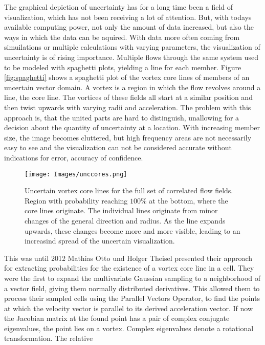 \noindent The graphical depiction of uncertainty has for a long time
been a field of visualization, which has not been receiving a lot of
attention. But, with todays available computing power, not only the
amount of data increased, but also the ways in which the data can be
aquired. With data more often coming from simuilations or multiple
calculations with varying parameters, the visualization of uncertainty
is of rising importance. Multiple flows through the same system used to
be modeled with spaghetti plots, yielding a line for each member. Figure
\ref{fig:spaghetti} shows a spaghetti plot of the vortex core lines of
members of an uncertain vector domain. A vortex is a region in which the
flow revolves around a line, the core line. The vortices of these fields
all start at a similar position and then twist upwards with varying
radii and acceleration. The problem with this approach is, that the
united parts are hard to distinguish, unallowing for a decision about
the quantity of uncertainty at a location. With increasing member size,
the image becomes cluttered, but high frequency areas are not
necessarily easy to see and the visualization can not be considered
accurate without indications for error, accuracy of confidence.\\
\begin{figure}[t]
    \centering
    \texttt{[image: Images/unccores.png]}
    \caption{Uncertain vortex core lines for the full set of correlated
    flow fields. Region with probability reaching $100\%$ at the bottom,
    where the core lines originate. The individual lines originate from
    minor changes of the general direction and radius. As the line expands
    upwards, these changes become more and more visible, leading to an
    increasind spread of the uncertain visualization.}
    \label{fig:UVC}
\end{figure}
\indent This was until 2012 Mathias Otto und Holger Theisel presented
their approach for extracting probabilities for the existence of a
vortex core line in a cell. They were the first to expand the
multivariate Gaussian sampling to a neighborhood of a vector field,
giving them normally distributed derivatives. This allowed them to
process their sampled cells using the Parallel Vectors Operator, to find
the points at which the velocity vector is parallel to its derived
acceleration vector. If now the Jacobian matrix at the found point has a
pair of complex conjugate eigenvalues, the point lies on a vortex.
Complex eigenvalues denote a rotational transformation. The relative
